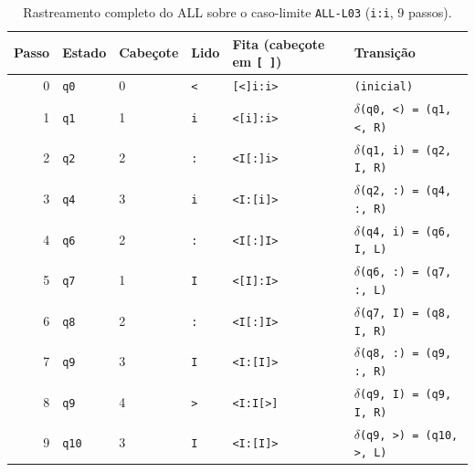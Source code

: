 \begin{table}[t]
\centering
\caption{Rastreamento completo do ALL sobre o caso-limite \texttt{ALL-L03} (\texttt{i:i}, 9 passos).}
\label{tab:trace_all_min}
\scriptsize\setlength{\tabcolsep}{5pt}
\begin{tabularx}{\textwidth}{@{}rllllX@{}}
\toprule
Passo & Estado & Cabeçote & Lido & Fita (cabeçote em \texttt{[ ]}) & Transição \\
\midrule
0 & \texttt{q0} & 0 & \texttt{<} & \texttt{[<]i:i>} & \texttt{(inicial)} \\
1 & \texttt{q1} & 1 & \texttt{i} & \texttt{<[i]:i>} & \texttt{$\delta$(q0, <) = (q1, <, R)} \\
2 & \texttt{q2} & 2 & \texttt{:} & \texttt{<I[:]i>} & \texttt{$\delta$(q1, i) = (q2, I, R)} \\
3 & \texttt{q4} & 3 & \texttt{i} & \texttt{<I:[i]>} & \texttt{$\delta$(q2, :) = (q4, :, R)} \\
4 & \texttt{q6} & 2 & \texttt{:} & \texttt{<I[:]I>} & \texttt{$\delta$(q4, i) = (q6, I, L)} \\
5 & \texttt{q7} & 1 & \texttt{I} & \texttt{<[I]:I>} & \texttt{$\delta$(q6, :) = (q7, :, L)} \\
6 & \texttt{q8} & 2 & \texttt{:} & \texttt{<I[:]I>} & \texttt{$\delta$(q7, I) = (q8, I, R)} \\
7 & \texttt{q9} & 3 & \texttt{I} & \texttt{<I:[I]>} & \texttt{$\delta$(q8, :) = (q9, :, R)} \\
8 & \texttt{q9} & 4 & \texttt{>} & \texttt{<I:I[>]} & \texttt{$\delta$(q9, I) = (q9, I, R)} \\
9 & \texttt{q10} & 3 & \texttt{I} & \texttt{<I:[I]>} & \texttt{$\delta$(q9, >) = (q10, >, L)} \\
\bottomrule
\end{tabularx}
\end{table}


